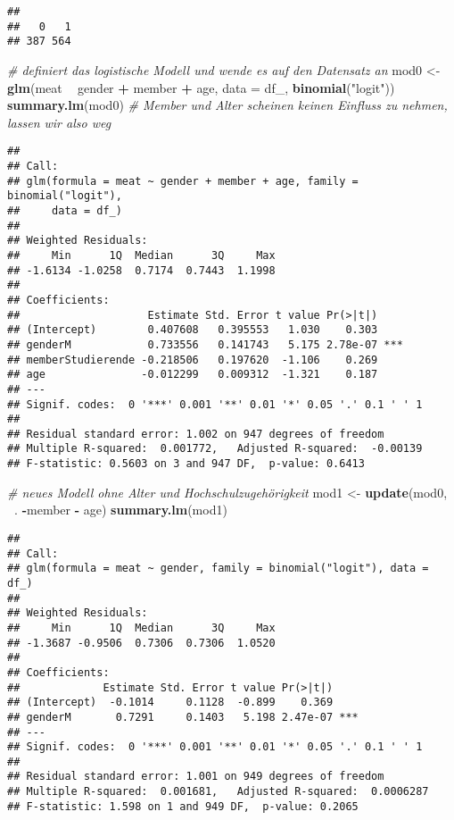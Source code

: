 \documentclass[]{article}
\newenvironment{Shaded}{\begin{snugshade}}{\end{snugshade}}
\newcommand{\KeywordTok}[1]{\textcolor[rgb]{0.13,0.29,0.53}{\textbf{#1}}}
\newcommand{\DataTypeTok}[1]{\textcolor[rgb]{0.13,0.29,0.53}{#1}}
\newcommand{\StringTok}[1]{\textcolor[rgb]{0.31,0.60,0.02}{#1}}
\newcommand{\CommentTok}[1]{\textcolor[rgb]{0.56,0.35,0.01}{\textit{#1}}}
\newcommand{\OperatorTok}[1]{\textcolor[rgb]{0.81,0.36,0.00}{\textbf{#1}}}
\newcommand{\NormalTok}[1]{#1}
\begin{document}
\begin{verbatim}
## 
##   0   1 
## 387 564
\end{verbatim}

\begin{Shaded}
\begin{Highlighting}[]
\CommentTok{# definiert das logistische Modell und wende es auf den Datensatz an}
\NormalTok{mod0 <-}\StringTok{ }\KeywordTok{glm}\NormalTok{(meat }\OperatorTok{~}\StringTok{ }\NormalTok{gender }\OperatorTok{+}\StringTok{ }\NormalTok{member }\OperatorTok{+}\StringTok{ }\NormalTok{age, }\DataTypeTok{data =}\NormalTok{ df_, }\KeywordTok{binomial}\NormalTok{(}\StringTok{"logit"}\NormalTok{))}
\KeywordTok{summary.lm}\NormalTok{(mod0) }\CommentTok{# Member  und Alter scheinen keinen Einfluss zu nehmen, lassen wir also weg}
\end{Highlighting}
\end{Shaded}

\begin{verbatim}
## 
## Call:
## glm(formula = meat ~ gender + member + age, family = binomial("logit"), 
##     data = df_)
## 
## Weighted Residuals:
##     Min      1Q  Median      3Q     Max 
## -1.6134 -1.0258  0.7174  0.7443  1.1998 
## 
## Coefficients:
##                    Estimate Std. Error t value Pr(>|t|)    
## (Intercept)        0.407608   0.395553   1.030    0.303    
## genderM            0.733556   0.141743   5.175 2.78e-07 ***
## memberStudierende -0.218506   0.197620  -1.106    0.269    
## age               -0.012299   0.009312  -1.321    0.187    
## ---
## Signif. codes:  0 '***' 0.001 '**' 0.01 '*' 0.05 '.' 0.1 ' ' 1
## 
## Residual standard error: 1.002 on 947 degrees of freedom
## Multiple R-squared:  0.001772,   Adjusted R-squared:  -0.00139 
## F-statistic: 0.5603 on 3 and 947 DF,  p-value: 0.6413
\end{verbatim}

\begin{Shaded}
\begin{Highlighting}[]
\CommentTok{# neues Modell ohne Alter und Hochschulzugehörigkeit}
\NormalTok{mod1 <-}\StringTok{ }\KeywordTok{update}\NormalTok{(mod0, }\OperatorTok{~}\NormalTok{. }\OperatorTok{-}\NormalTok{member }\OperatorTok{-}\StringTok{ }\NormalTok{age)}
\KeywordTok{summary.lm}\NormalTok{(mod1)}
\end{Highlighting}
\end{Shaded}

\begin{verbatim}
## 
## Call:
## glm(formula = meat ~ gender, family = binomial("logit"), data = df_)
## 
## Weighted Residuals:
##     Min      1Q  Median      3Q     Max 
## -1.3687 -0.9506  0.7306  0.7306  1.0520 
## 
## Coefficients:
##             Estimate Std. Error t value Pr(>|t|)    
## (Intercept)  -0.1014     0.1128  -0.899    0.369    
## genderM       0.7291     0.1403   5.198 2.47e-07 ***
## ---
## Signif. codes:  0 '***' 0.001 '**' 0.01 '*' 0.05 '.' 0.1 ' ' 1
## 
## Residual standard error: 1.001 on 949 degrees of freedom
## Multiple R-squared:  0.001681,   Adjusted R-squared:  0.0006287 
## F-statistic: 1.598 on 1 and 949 DF,  p-value: 0.2065
\end{verbatim}
\end{document}
